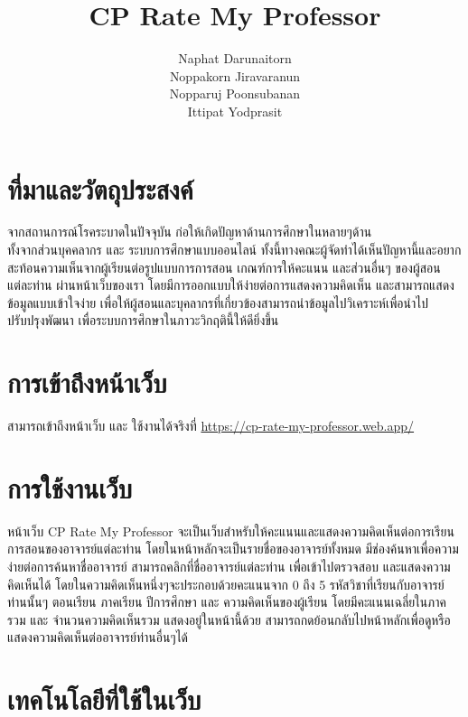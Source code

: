 \documentclass[17pt]{extarticle}
\title{\huge\textbf{CP Rate My Professor}}
\author{Naphat Darunaitorn\\ Noppakorn Jiravaranun\\ Nopparuj Poonsubanan\\ Ittipat Yodprasit}
\begin{document}
\maketitle
\pagebreak
\tableofcontents
\pagebreak
\section{ที่มาและวัตถุประสงค์}

จากสถานการณ์โรคระบาดในปัจจุบัน ก่อให้เกิดปัญหาด้านการศึกษาในหลายๆด้าน\\
ทั้งจากส่วนบุคคลากร และ ระบบการศึกษาแบบออนไลน์
ทั้งนี้ทางคณะผู้จัดทำได้เห็นปัญหานี้และอยากสะท้อนความเห็นจากผู้เรียนต่อรูปแบบการการสอน
เกณฑ์การให้คะแนน และส่วนอื่นๆ ของผู้สอนแต่ละท่าน ผ่านหน้าเว็บของเรา
โดยมีการออกแบบให้ง่ายต่อการแสดงความคิดเห็น และสามารถแสดงข้อมูลแบบเข้าใจง่าย
เพื่อให้ผู้สอนและบุคลากรที่เกี่ยวข้องสามารถนำข้อมูลไปวิเคราะห์เพื่อนำไปปรับปรุงพัฒนา
เพื่อระบบการศึกษาในภาวะวิกฤตินี้ให้ดียิ่งขึ้น

\section{การเข้าถึงหน้าเว็บ}
สามารถเข้าถึงหน้าเว็บ และ ใช้งานได้จริงที่ {\color{blue}\url{https://cp-rate-my-professor.web.app/}}

\section{การใช้งานเว็บ}
หน้าเว็บ CP Rate My Professor จะเป็นเว็บสำหรับให้คะแนนและแสดงความคิดเห็นต่อการเรียนการสอนของอาจารย์แต่ละท่าน
โดยในหน้าหลักจะเป็นรายชื่อของอาจารย์ทั้งหมด มีช่องค้นหาเพื่อความง่ายต่อการค้นหาชื่ออาจารย์
สามารถคลิกที่ชื่ออาจารย์แต่ละท่าน เพื่อเข้าไปตรวจสอบ และแสดงความคิดเห็นได้
โดยในความคิดเห็นหนึ่งๆจะประกอบด้วยคะแนนจาก 0 ถึง 5 รหัสวิชาที่เรียนกับอาจารย์ท่านนั้นๆ ตอนเรียน ภาคเรียน ปีการศึกษา และ ความคิดเห็นของผู้เรียน
โดยมีคะแนนเฉลี่ยในภาครวม และ จำนวนความคิดเห็นรวม แสดงอยู่ในหน้านี้ด้วย สามารถกดย้อนกลับไปหน้าหลักเพื่อดูหรือแสดงความคิดเห็นต่ออาจารย์ท่านอื่นๆได้

\pagebreak
\section{เทคโนโลยีที่ใช้ในเว็บ}
\end{document}
